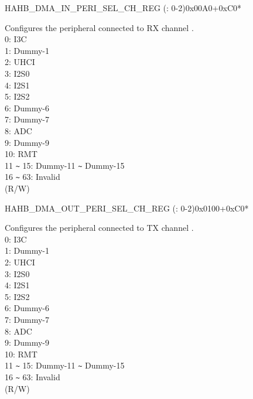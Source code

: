 \begin{register}{H}{AHB\_DMA\_IN\_PERI\_SEL\_CH\_REG (: 0-2)}{0x00A0+0xC0*}\label{regdesc:AHBDMAINPERISELCHNREG}
%
%
\regnewline%
\begin{regdesc}\begin{reglist}
\label{fielddesc:AHBDMAPERIINSELCHN}\item [AHB\_DMA\_PERI\_IN\_SEL\_CH\regindex{n}] Configures the peripheral connected to RX channel .\\
0: I3C\\
1: Dummy-1\\
2: UHCI\\
3: I2S0\\
4: I2S1\\
5: I2S2\\
6: Dummy-6\\
7: Dummy-7\\
8: ADC\\
9: Dummy-9\\
10: RMT\\
11 \verb+~+ 15: Dummy-11 \verb+~+ Dummy-15\\
16 \verb+~+ 63: Invalid\\
(R/W)
\end{reglist}\end{regdesc}
\end{register}


\begin{register}{H}{AHB\_DMA\_OUT\_PERI\_SEL\_CH\_REG (: 0-2)}{0x0100+0xC0*}\label{regdesc:AHBDMAOUTPERISELCHNREG}
%
%
\regnewline%
\begin{regdesc}\begin{reglist}
\label{fielddesc:AHBDMAPERIOUTSELCHN}\item [AHB\_DMA\_PERI\_OUT\_SEL\_CH\regindex{n}] Configures the peripheral connected to TX channel .\\
0: I3C\\
1: Dummy-1\\
2: UHCI\\
3: I2S0\\
4: I2S1\\
5: I2S2\\
6: Dummy-6\\
7: Dummy-7\\
8: ADC\\
9: Dummy-9\\
10: RMT\\
11 \verb+~+ 15: Dummy-11 \verb+~+ Dummy-15\\
16 \verb+~+ 63: Invalid\\
(R/W)
\end{reglist}\end{regdesc}
\end{register}



